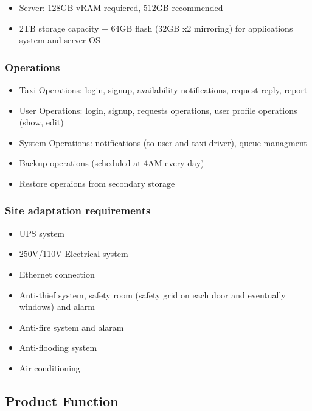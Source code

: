\documentclass[english]{article}
\begin{document}
\begin{itemize}
	\item Server: 128GB vRAM  requiered, 512GB recommended
	\item 2TB storage capacity + 64GB flash (32GB x2 mirroring) for applications system and server OS
\end{itemize}

\subsubsection{Operations}

\begin{itemize}
	\item Taxi Operations: login, signup, availability notifications, request reply, report
	\item User Operations: login, signup, requests operations, user profile operations (show, edit)
	\item System Operations: notifications (to user and taxi driver), queue managment
	\item Backup operations (scheduled at 4AM every day)
	\item Restore operaions from secondary storage
\end{itemize}

\subsubsection{Site adaptation requirements}

\begin{itemize}
	\item UPS system
	\item 250V/110V Electrical system
	\item Ethernet connection
	\item Anti-thief system, safety room (safety grid on each door and eventually windows) and alarm
	\item Anti-fire system and alaram
	\item Anti-flooding system
	\item Air conditioning
\end{itemize}

\subsection{Product Function}
\end{document}
